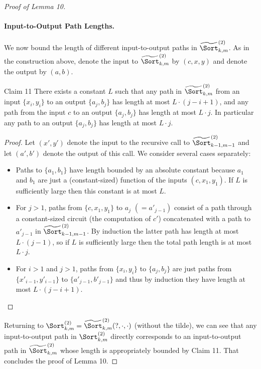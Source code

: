 \begin{proof}[Proof of Lemma 10]
\paragraph{Input-to-Output Path Lengths.} We now bound the length of different input-to-output paths in $\widetilde{\Sort}^{(2)}_{k,m}$. As in the construction above, denote the input to $\widetilde{\Sort}^{(2)}_{k,m}$ by $(c,x,y)$ and denote the output by $(a,b)$.
\begin{originalresult}{Claim 11}
There exists a constant $L$ such that any path in $\widetilde{\Sort}^{(2)}_{k,m}$ from an input $\{x_i,y_i\}$ to an output $\{a_j,b_j\}$ has length at most $L\cdot(j-i+1)$, and any path from the input $c$ to an output $\{a_j,b_j\}$ has length at most $L\cdot j$. In particular any path to an output $\{a_j,b_j\}$ has length at most $L\cdot j$.
\end{originalresult}
\begin{proof}
Let $(x',y')$ denote the input to the recursive call to $\widetilde{\Sort}^{(2)}_{k-1,m-1}$ and let $(a',b')$ denote the output of this call. We consider several cases separately:
\begin{itemize}
\item Paths to $\{a_1,b_1\}$ have length bounded by an absolute constant because $a_1$ and $b_1$ are just a (constant-sized) function of the inputs $(c,x_1,y_1)$. If $L$ is sufficiently large then this constant is at most $L$.
\item For $j>1$, paths from $\{c,x_1,y_1\}$ to $a_j$ $(=a'_{j-1})$ consist of a path through a constant-sized circuit (the computation of $c'$) concatenated with a path to $a'_{j-1}$ in $\widetilde{\Sort}^{(2)}_{k-1,m-1}$. By induction the latter path has length at most $L\cdot(j-1)$, so if $L$ is sufficiently large then the total path length is at most $L\cdot j$.
\item For $i>1$ and $j>1$, paths from $\{x_i,y_i\}$ to $\{a_j,b_j\}$ are just paths from $\{x'_{i-1},y'_{i-1}\}$ to $\{a'_{j-1},b'_{j-1}\}$ and thus by induction they have length at most $L\cdot(j-i+1)$.
\end{itemize}
\end{proof}
Returning to $\Sort^{(2)}_{k,m}=\widetilde{\Sort}^{(2)}_{k,m}(?,\cdot,\cdot)$ (without the tilde), we can see that any input-to-output path in $\Sort^{(2)}_{k,m}$ directly corresponds to an input-to-output path in $\widetilde{\Sort}^{(2)}_{k,m}$ whose length is appropriately bounded by Claim 11. That concludes the proof of Lemma 10.
\end{proof}
